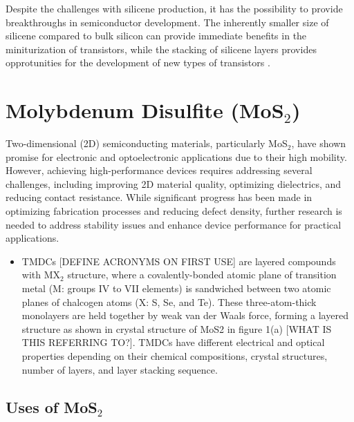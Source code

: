 \documentclass[conference]{IEEEtran}
\begin{document}
Despite the challenges with silicene production, it has the possibility to provide breakthroughs in semiconductor development. The inherently smaller size of silicene compared to bulk silicon can provide immediate benefits in the miniturization of transistors, while the stacking of silicene layers provides opprotunities for the development of new types of transistors \cite{b14,b13}.

\section{Molybdenum Disulfite (MoS$_2$)}

Two-dimensional (2D) semiconducting materials, particularly MoS$_2$, have shown promise for electronic and optoelectronic applications due to their high mobility. However, achieving high-performance devices requires addressing several challenges, including improving 2D material quality, optimizing dielectrics, and reducing contact resistance. While significant progress has been made in optimizing fabrication processes and reducing defect density, further research is needed to address stability issues and enhance device performance for practical applications.

\begin{itemize}

  \item  TMDCs [DEFINE ACRONYMS ON FIRST USE] are layered compounds with MX$_2$ structure, where a covalently-bonded atomic plane of transition metal (M: groups IV to VII elements) is sandwiched between two atomic planes of chalcogen atoms (X: S, Se, and Te). These three-atom-thick monolayers are held together by weak van der Waals force, forming a layered structure as shown in crystal structure of MoS2 in figure 1(a) [WHAT IS THIS REFERRING TO?]. TMDCs have different electrical and optical properties depending on their chemical compositions, crystal structures, number of layers, and layer stacking sequence. 

\end{itemize}

\subsection{Uses of MoS$_2$}
\end{document}
